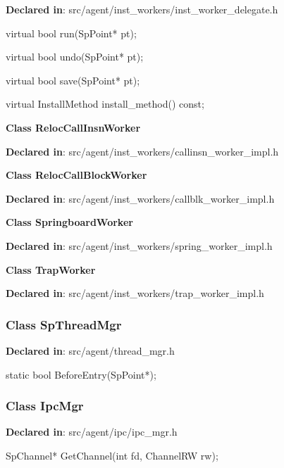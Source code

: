 \textbf{Declared in}: src/agent/inst\_workers/inst_worker_delegate.h

\begin{apient}
virtual bool run(SpPoint* pt);
\end{apient}

\begin{apient}
virtual bool undo(SpPoint* pt);
\end{apient}

\begin{apient}
virtual bool save(SpPoint* pt);
\end{apient}

\begin{apient}
virtual InstallMethod install_method() const;
\end{apient}

\textbf{Class RelocCallInsnWorker}

\textbf{Declared in}: src/agent/inst\_workers/callinsn_worker_impl.h

\textbf{Class RelocCallBlockWorker}

\textbf{Declared in}: src/agent/inst\_workers/callblk_worker_impl.h

\textbf{Class SpringboardWorker}

\textbf{Declared in}: src/agent/inst\_workers/spring_worker_impl.h

\textbf{Class TrapWorker}

\textbf{Declared in}: src/agent/inst\_workers/trap_worker_impl.h


\subsubsection{Class SpThreadMgr}
\textbf{Declared in}: src/agent/thread\_mgr.h

\begin{apient}
static bool BeforeEntry(SpPoint*);
\end{apient}
\apidesc{
}

\subsubsection{Class IpcMgr}
\textbf{Declared in}: src/agent/ipc/ipc\_mgr.h

\begin{apient}
SpChannel* GetChannel(int fd,
                      ChannelRW rw);
\end{apient}
\apidesc{
}

